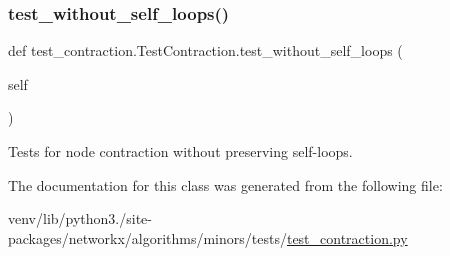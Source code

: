 \subsubsection{\texorpdfstring{test\+\_\+without\+\_\+self\+\_\+loops()}{test\_without\_self\_loops()}}
{\footnotesize\ttfamily def test\+\_\+contraction.\+Test\+Contraction.\+test\+\_\+without\+\_\+self\+\_\+loops (\begin{DoxyParamCaption}\item[{}]{self }\end{DoxyParamCaption})}

\begin{DoxyVerb}Tests for node contraction without preserving self-loops.\end{DoxyVerb}
 

The documentation for this class was generated from the following file\+:\begin{DoxyCompactItemize}
\item 
venv/lib/python3./site-\/packages/networkx/algorithms/minors/tests/\hyperlink{test__contraction_8py}{test\+\_\+contraction.\+py}\end{DoxyCompactItemize}
